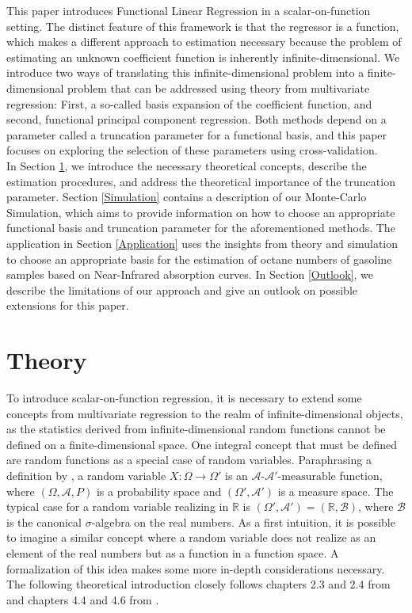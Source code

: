 \documentclass[11pt,twoside,a4paper]{article}
\begin{document}
	This paper introduces Functional Linear Regression in a scalar-on-function setting. The distinct feature of this framework is that the regressor is a function, which makes a different approach to estimation necessary because the problem of estimating an unknown coefficient function is inherently infinite-dimensional. 
	We introduce two ways of translating this infinite-dimensional problem into a finite-dimensional problem that can be addressed using theory from multivariate regression: First, a so-called basis expansion of the coefficient function, and second, functional principal component regression. Both methods depend on a parameter called a truncation parameter for a functional basis, and this paper focuses on exploring the selection of these parameters using cross-validation.\\
	
	In Section \ref{Theory}, we introduce the necessary theoretical concepts, describe the estimation procedures, and address the theoretical importance of the truncation parameter. Section \ref{Simulation} contains a description of our Monte-Carlo Simulation, which aims to provide information on how to choose an appropriate functional basis and truncation parameter for the aforementioned methods. The application in Section \ref{Application} uses the insights from theory and simulation to choose an appropriate basis for the estimation of octane numbers of gasoline samples based on Near-Infrared absorption curves. In Section \ref{Outlook}, we describe the limitations of our approach and give an outlook on possible extensions for this paper.

	\section{Theory}\label{Theory}
	To introduce scalar-on-function regression, it is necessary to extend some concepts from multivariate regression to the realm of infinite-dimensional objects, as the statistics derived from infinite-dimensional random functions cannot be defined on a finite-dimensional space. One integral concept that must be defined are random functions as a special case of random variables. Paraphrasing a definition by \cite{bauer_wahrscheinlichkeitstheorie_2020}, a random variable $X:\Omega \rightarrow \Omega'$ is an $\mathcal{A} \text{-} \mathcal{A'} \text{-measurable}$ function, where $(\Omega, \mathcal{A}, P)$ is a probability space and $(\Omega', \mathcal{A'})$ is a measure space. 
	The typical case for a random variable realizing in $\mathbb{R}$ is $(\Omega', \mathcal{A'}) = (\mathbb{R}, \mathcal{B})$, where $\mathcal{B}$ is the canonical $\sigma$-algebra on the real numbers. As a first intuition, it is possible to imagine a similar concept where a random variable does not realize as an element of the real numbers but as a function in a function space. A formalization of this idea makes some more in-depth considerations necessary. The following theoretical introduction closely follows chapters 2.3 and 2.4 from \cite{hsing_theoretical_2015} and chapters 4.4 and 4.6 from \cite{kokoszka_introduction_2017}. 
	
\end{document}
